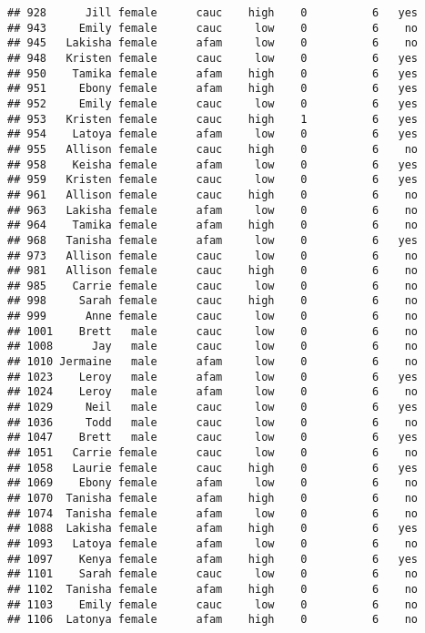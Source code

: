 \documentclass[
]{article}
\begin{document}
\begin{verbatim}
## 928      Jill female      cauc    high    0          6   yes
## 943     Emily female      cauc     low    0          6    no
## 945   Lakisha female      afam     low    0          6    no
## 948   Kristen female      cauc     low    0          6   yes
## 950    Tamika female      afam    high    0          6   yes
## 951     Ebony female      afam    high    0          6   yes
## 952     Emily female      cauc     low    0          6   yes
## 953   Kristen female      cauc    high    1          6   yes
## 954    Latoya female      afam     low    0          6   yes
## 955   Allison female      cauc    high    0          6    no
## 958    Keisha female      afam     low    0          6   yes
## 959   Kristen female      cauc     low    0          6   yes
## 961   Allison female      cauc    high    0          6    no
## 963   Lakisha female      afam     low    0          6    no
## 964    Tamika female      afam    high    0          6    no
## 968   Tanisha female      afam     low    0          6   yes
## 973   Allison female      cauc     low    0          6    no
## 981   Allison female      cauc    high    0          6    no
## 985    Carrie female      cauc     low    0          6    no
## 998     Sarah female      cauc    high    0          6    no
## 999      Anne female      cauc     low    0          6    no
## 1001    Brett   male      cauc     low    0          6    no
## 1008      Jay   male      cauc     low    0          6    no
## 1010 Jermaine   male      afam     low    0          6    no
## 1023    Leroy   male      afam     low    0          6   yes
## 1024    Leroy   male      afam     low    0          6    no
## 1029     Neil   male      cauc     low    0          6   yes
## 1036     Todd   male      cauc     low    0          6    no
## 1047    Brett   male      cauc     low    0          6   yes
## 1051   Carrie female      cauc     low    0          6    no
## 1058   Laurie female      cauc    high    0          6   yes
## 1069    Ebony female      afam     low    0          6    no
## 1070  Tanisha female      afam    high    0          6    no
## 1074  Tanisha female      afam     low    0          6    no
## 1088  Lakisha female      afam    high    0          6   yes
## 1093   Latoya female      afam     low    0          6    no
## 1097    Kenya female      afam    high    0          6   yes
## 1101    Sarah female      cauc     low    0          6    no
## 1102  Tanisha female      afam    high    0          6    no
## 1103    Emily female      cauc     low    0          6    no
## 1106  Latonya female      afam    high    0          6    no

\end{verbatim}
\end{document}
